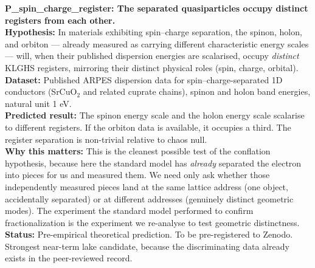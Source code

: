 \documentclass[11pt, letterpaper, openany]{book}
\begin{document}
\begin{predictionbox}
\textbf{P\_spin\_charge\_register: The separated quasiparticles occupy
distinct registers from each other.}\\[0.5em]
\textbf{Hypothesis:} In materials exhibiting spin--charge separation, the
spinon, holon, and orbiton --- already measured as carrying different
characteristic energy scales --- will, when their published dispersion
energies are scalarised, occupy \emph{distinct} KLGHS registers, mirroring
their distinct physical roles (spin, charge, orbital).\\[0.5em]
\textbf{Dataset:} Published ARPES dispersion data for spin--charge-separated
1D conductors (SrCuO$_2$ and related cuprate chains), spinon and holon
band energies, natural unit 1 eV.\\[0.5em]
\textbf{Predicted result:} The spinon energy scale and the holon energy
scale scalarise to different registers. If the orbiton data is available,
it occupies a third. The register separation is non-trivial relative to
chaos null.\\[0.5em]
\textbf{Why this matters:} This is the cleanest possible test of the
conflation hypothesis, because here the standard model has \emph{already}
separated the electron into pieces for us and measured them. We need only
ask whether those independently measured pieces land at the same lattice
address (one object, accidentally separated) or at different addresses
(genuinely distinct geometric modes). The experiment the standard model
performed to confirm fractionalization is the experiment we re-analyse to
test geometric distinctness.\\[0.5em]
\textbf{Status:} Pre-empirical theoretical prediction. To be pre-registered
to Zenodo. Strongest near-term lake candidate, because the discriminating
data already exists in the peer-reviewed record.
\end{predictionbox}
 
\end{document}
